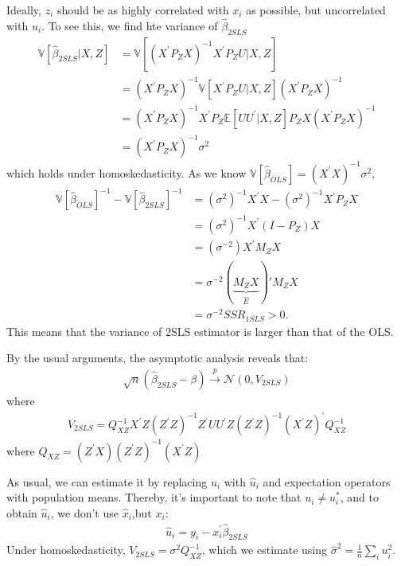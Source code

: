 Ideally, $z_i$ should be as highly correlated with $x_i$ as possible, but uncorrelated with $u_i$.
To see this, we find hte variance of $\hat{\beta}_{2SLS}$
\begin{align*}
    \mathbb{V}[\hat{\beta}_{2SLS} | X, Z] &= \mathbb{V}\left[\left(X^{\prime} P_Z X \right)^{-1} X^{\prime} P_Z U | X, Z \right] \\
    &= \left(X^{\prime} P_Z X \right)^{-1} \mathbb{V}\left[X^{\prime} P_Z U | X, Z \right] \left(X^{\prime} P_Z X \right)^{-1} \\
    &= \left(X^{\prime} P_Z X \right)^{-1} X^{\prime} P_Z \mathbb{E}[U U^{\prime} | X, Z] P_Z X \left(X^{\prime} P_Z X \right)^{-1}\\
    &= \left(X^{\prime} P_Z X\right)^{-1} \sigma^2
\end{align*}
which holds under homoskedasticity.
As we know $\mathbb{V}[\hat{\beta}_{OLS}] = (X^{\prime} X)^{-1} \sigma^2$, 
\begin{align*}
    \mathbb{V}\left[\hat{\beta}_{OLS}\right]^{-1} - \mathbb{V}\left[\hat{\beta}_{2SLS} \right]^{-1} &= (\sigma^2)^{-1} X^{\prime} X - (\sigma^2)^{-1} X^{\prime} P_Z X \\
    &= (\sigma^2)^{-1} X^{\prime} (I - P_Z) X \\
    &= (\sigma^{-2}) X^{\prime} M_Z X \\
    &= \sigma^{-2} (\underset{\hat{E}}{\underbrace{M_Z X}})' M_Z X \\
    &= \sigma^{-2} SSR_{1SLS} > 0.
\end{align*}
This means that the variance of 2SLS estimator is larger than that of the OLS.

By the usual arguments, the asymptotic analysis reveals that:
\begin{gather*}
    \sqrt{n} (\hat{\beta}_{2SLS} - \beta) \overset{p}{\rightarrow} \mathcal{N} (0, V_{2SLS})
\end{gather*}
where
\begin{gather*}
    V_{2SLS}  = Q_{XZ}^{-1} X^{\prime} Z \left(Z^{\prime} Z\right)^{-1} Z^{\prime} U U^{\prime} Z \left(Z^{\prime} Z \right)^{-1} \left(X^{\prime} Z\right)^{\prime} Q_{XZ}^{-1}
\end{gather*}
where $Q_{XZ} = \left(Z^{\prime} X\right) \left(Z^{\prime} Z\right)^{-1}  \left(X^{\prime} Z\right)$

As usual, we can estimate it by replacing $u_i$ with $\hat{u}_i$ and expectation operators with population means.
Thereby, it's important to note that $u_i \neq u_i^*$, and to obtain $\hat{u}_i$, we don't use $\hat{x}_i$,but $x_i$:
\begin{gather*}
     \hat{u}_i = y_i - x_i^{\prime} \hat{\beta}_{2SLS}
\end{gather*}
Under homoskedasticity, $V_{2SLS} = \sigma^2 Q_{XZ}^{-1} $, which we estimate using $\hat{\sigma}^2 = \frac{1}{n} \sum_i u_i^2$.


